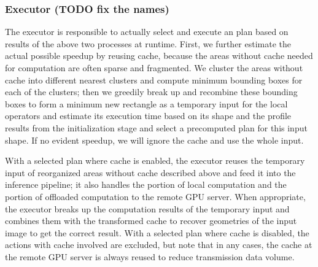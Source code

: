 \subsubsection{Executor (TODO fix the names)}
The executor is responsible to actually select and execute an plan based on results of the above two processes at runtime.
First, we further estimate the actual possible speedup by reusing cache, because the areas without cache needed for computation are often sparse and fragmented.
We cluster the areas without cache into different nearest clusters and compute minimum bounding boxes for each of the clusters;
then we greedily break up and recombine these bounding boxes to form a minimum new rectangle as a temporary input for the local operators and estimate its execution time based on its shape and the profile results from the initialization stage and select a precomputed plan for this input shape.
If no evident speedup, we will ignore the cache and use the whole input.

With a selected plan where cache is enabled, the executor reuses the temporary input of reorganized areas without cache described above and feed it into the inference pipeline; it also handles the portion of local computation and the portion of offloaded computation to the remote GPU server.
When appropriate, the executor breaks up the computation results of the temporary input and combines them with the transformed cache to recover geometries of the input image to get the correct result.
With a selected plan where cache is disabled, the actions with cache involved are excluded, but note that in any cases, the cache at the remote GPU server is always reused to reduce transmission data volume.









